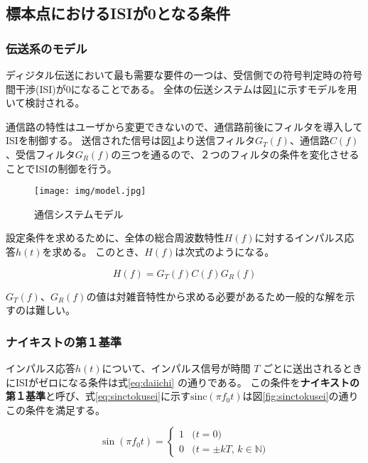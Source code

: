 \documentclass[twocolumn, dvipdfmx, 9pt]{jsarticle}
\begin{document}
\subsection{標本点におけるISIが0となる条件}

\subsubsection{伝送系のモデル}

ディジタル伝送において最も需要な要件の一つは、受信側での符号判定時の符号間干渉(ISI)が0になることである。
全体の伝送システムは図\ref{fig:model}に示すモデルを用いて検討される。

通信路の特性はユーザから変更できないので、通信路前後にフィルタを導入してISIを制御する。
送信された信号は図\ref{fig:model}より送信フィルタ$ G_T (f)$、通信路$C (f)$、受信フィルタ$ G_R (f)$の三つを通るので、２つのフィルタの条件を変化させることでISIの制御を行う。

  \begin{figure}[ht]
  \centering
  \texttt{[image: img/model.jpg]}
  \caption{通信システムモデル}
  \label{fig:model}
\end{figure}

設定条件を求めるために、全体の総合周波数特性$H (f)$に対するインパルス応答$h(t)$を求める。
このとき、$H(f)$は次式のようになる。

  \begin{equation}\label{eq:shuhasutokusei}
    H(f) = G_T (f) C (f) G_R (f)
  \end{equation}
  
  $ G_T (f)$、$ G_R (f)$の値は対雑音特性から求める必要があるため一般的な解を示すのは難しい。
  

  
  

\subsubsection{ナイキストの第１基準}

インパルス応答$ h (t) $について、インパルス信号が時間 $ T $ ごとに送出されるときにISIがゼロになる条件は式\eqref{eq:daiichi} の通りである。
この条件を\textbf{ナイキストの第１基準}と呼び、式\eqref{eq:sinctokusei}に示す$ \mathrm{sinc} (\pi f_0 t) $は図\ref{fig:sinctokusei}の通りこの条件を満足する。




\begin{equation}
\label{eq:daiichi}
\sin(\pi f_0 t) =
\left\{
  \begin{array}{rl}
  1  & \text{($t = 0$)} \\
  0  & \text{($t = \pm kT$, $k \in \mathbb{N}$)}
  \end{array}
\right.
\end{equation}
\end{document}
